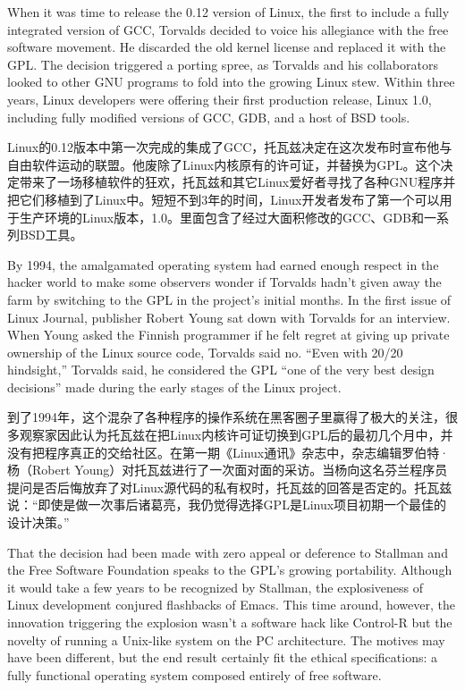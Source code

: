 \ifdefined\eng
When it was time to release the 0.12 version of Linux, the first to include a fully integrated version of GCC, Torvalds decided to voice his allegiance with the free software movement. He discarded the old kernel license and replaced it with the GPL. The decision triggered a porting spree, as Torvalds and his collaborators looked to other GNU programs to fold into the growing Linux stew. Within three years, Linux developers were offering their first production release, Linux 1.0, including fully modified versions of GCC, GDB, and a host of BSD tools.
\fi

\ifdefined\chs
Linux的0.12版本中第一次完成的集成了GCC，托瓦兹决定在这次发布时宣布他与自由软件运动的联盟。他废除了Linux内核原有的许可证，并替换为GPL。这个决定带来了一场移植软件的狂欢，托瓦兹和其它Linux爱好者寻找了各种GNU程序并把它们移植到了Linux中。短短不到3年的时间，Linux开发者发布了第一个可以用于生产环境的Linux版本，1.0。里面包含了经过大面积修改的GCC、GDB和一系列BSD工具。
\fi


\ifdefined\eng
By 1994, the amalgamated operating system had earned enough respect in the hacker world to make some observers wonder if Torvalds hadn't given away the farm by switching to the GPL in the project's initial months. In the first issue of Linux Journal, publisher Robert Young sat down with Torvalds for an interview. When Young asked the Finnish programmer if he felt regret at giving up private ownership of the Linux source code, Torvalds said no. ``Even with 20/20 hindsight,'' Torvalds said, he considered the GPL ``one of the very best design decisions'' made during the early stages of the Linux project.
\fi

\ifdefined\chs
到了1994年，这个混杂了各种程序的操作系统在黑客圈子里赢得了极大的关注，很多观察家因此认为托瓦兹在把Linux内核许可证切换到GPL后的最初几个月中，并没有把程序真正的交给社区。在第一期《Linux通讯》杂志中，杂志编辑罗伯特·杨（Robert Young）对托瓦兹进行了一次面对面的采访。当杨向这名芬兰程序员提问是否后悔放弃了对Linux源代码的私有权时，托瓦兹的回答是否定的。托瓦兹说：``即使是做一次事后诸葛亮，我仍觉得选择GPL是Linux项目初期一个最佳的设计决策。''
\fi

\ifdefined\eng
That the decision had been made with zero appeal or deference to Stallman and the Free Software Foundation speaks to the GPL's growing portability. Although it would take a few years to be recognized by Stallman, the explosiveness of Linux development conjured flashbacks of Emacs. This time around, however, the innovation triggering the explosion wasn't a software hack like Control-R but the novelty of running a Unix-like system on the PC architecture. The motives may have been different, but the end result certainly fit the ethical specifications: a fully functional operating system composed entirely of free software.
\fi

